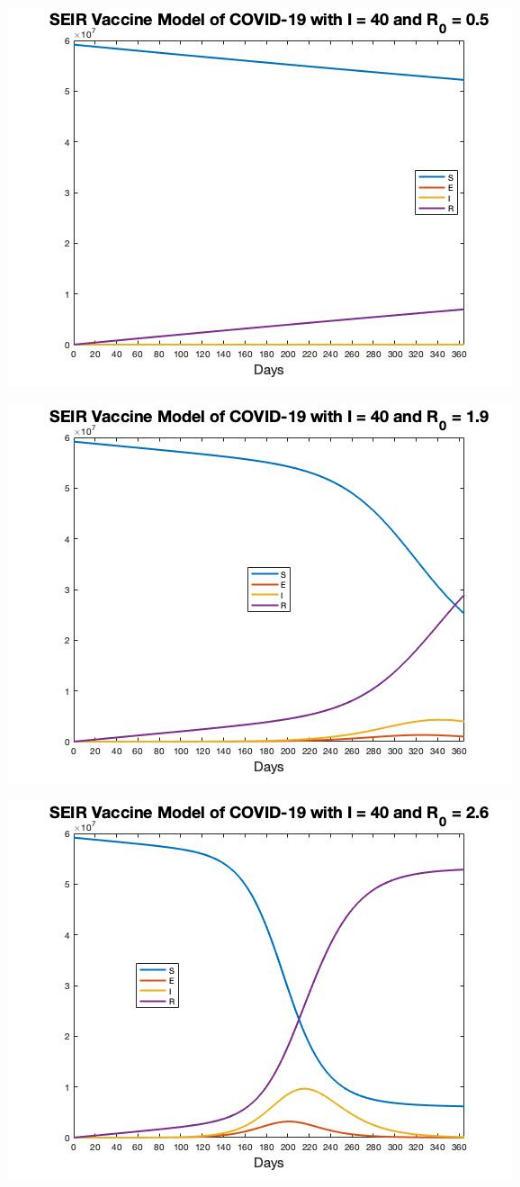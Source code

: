 \documentclass[12pt, a4paper]{article}
\begin{document}
    \includegraphics[scale=0.75]{plots/i40r5_seir_vac.jpg}
    
    
    \includegraphics[scale=0.75]{plots/i40r19_seir_vac.jpg}
    
    \includegraphics[scale=0.75]{plots/i40r26_seir_vac.jpg}
 
\end{document}
